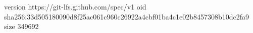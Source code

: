 version https://git-lfs.github.com/spec/v1
oid sha256:33d505180090d8f25ac061c960c26922a4cbf01ba4c1e02b8457308b10dc2fa9
size 349692
